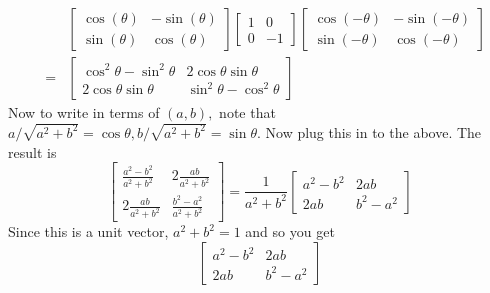 \documentclass{ximera}
\begin{document}
\begin{problem}
\begin{hint}
\begin{eqnarray*}
&&\left[
\begin{array}{cc}
\cos \left( \theta \right) & -\sin \left( \theta \right) \\
\sin \left( \theta \right) & \cos \left( \theta \right)
\end{array}
\right] \left[
\begin{array}{rr}
1 & 0 \\
0 & -1
\end{array}
\right] \left[
\begin{array}{cc}
\cos \left( -\theta \right) & -\sin \left( -\theta \right) \\
\sin \left( -\theta \right) & \cos \left( -\theta \right)
\end{array}
\right] \\
&=& \left[
\begin{array}{cc}
\cos ^{2}\theta -\sin ^{2}\theta & 2\cos \theta \sin \theta \\
2\cos \theta \sin \theta & \sin ^{2}\theta -\cos ^{2}\theta%
\end{array}
\right]
\end{eqnarray*}
Now to write in terms of $\left( a,b\right) ,$ note that $a/\sqrt{a^{2}+b^{2}
}=\cos \theta ,b/\sqrt{a^{2}+b^{2}}=\sin \theta .$ Now plug this in to the
above. The result is
\[
\left[
\begin{array}{cc}
\frac{a^{2}-b^{2}}{a^{2}+b^{2}} & 2\frac{ab}{a^{2}+b^{2}} \\
2\frac{ab}{a^{2}+b^{2}} & \frac{b^{2}-a^{2}}{a^{2}+b^{2}}
\end{array}
\right] =\frac{1}{a^{2}+b^{2}}\left[
\begin{array}{cc}
a^{2}-b^{2} & 2ab \\
2ab & b^{2}-a^{2}
\end{array}
\right]
\]
Since this is a unit vector, $a^{2}+b^{2}=1$ and so you get
\[
\left[
\begin{array}{cc}
a^{2}-b^{2} & 2ab \\
2ab & b^{2}-a^{2}
\end{array}
\right]
\]
\end{hint}
\end{problem}
\end{document}
